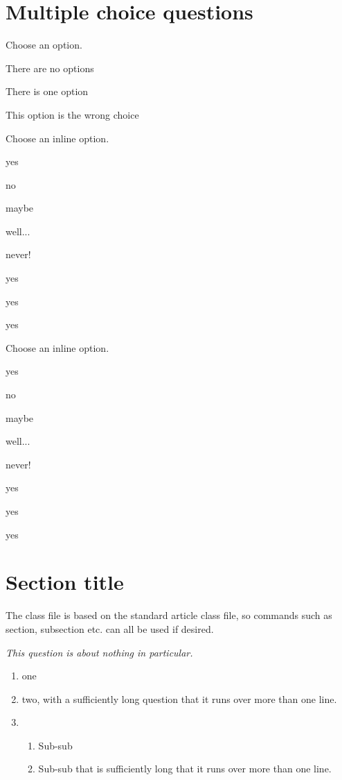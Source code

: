 \documentclass{ouexam}
\begin{document}
\section{Multiple choice questions}


\question
Choose an option.
\begin{options}
\item There are no options
\item There is one option
\item This option is the wrong choice
\end{options}


\question
Choose an inline option.
\begin{inlineoptions}{5} %
\item yes
\item no
\item maybe
\item well...
\item never!
\item yes
\item yes
\item yes
\noitem %
\noitem
\end{inlineoptions}

\question
Choose an inline option.
\begin{inlineoptions}[1.5]{3} %
\item yes
\item no
\item maybe
\item well...
\item never!
\item yes
\item yes
\item yes
\noitem %
\end{inlineoptions}

\section{Section title}

The class file is based on the standard article class file, so commands such as section, subsection etc. can all be used if desired.


\question
\emph{This question is about nothing in particular.}
\begin{enumerate}
\item one
\item two, with a sufficiently long question that it runs over more than one line.
\item 
\begin{enumerate}
\item Sub-sub
\item Sub-sub that is sufficiently long that it runs over more than one line.
\end{enumerate}
\end{enumerate}
\end{document}
